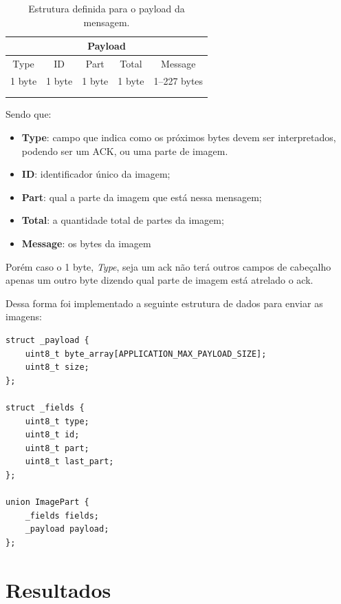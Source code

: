 \documentclass[
article,			%
12pt,				%
oneside,			%
a4paper,			%
english,			%
brazil,				%
sumario=tradicional
]{abntex2}
\begin{document}
\begin{table}[h]
\caption{Estrutura definida para o payload da mensagem.}
\centering
\begin{tabular}{cllll}
\hline
\multicolumn{5}{|c|}{Payload}    \\ \hline
\multicolumn{1}{|c|}{Type}   & \multicolumn{1}{c|}{ID}     & \multicolumn{1}{c|}{Part}   & \multicolumn{1}{c|}{Total}  & \multicolumn{1}{c|}{Message}      \\ \hline
\multicolumn{1}{|c|}{1 byte} & \multicolumn{1}{c|}{1 byte} & \multicolumn{1}{c|}{1 byte} & \multicolumn{1}{c|}{1 byte} & \multicolumn{1}{c|}{1--227 bytes} \\ \hline
\multicolumn{1}{l}{} &  &  &  &  \\
\multicolumn{1}{l}{} &  &  &  & 
\end{tabular}
\end{table}

Sendo que:
\begin{itemize}
    \item\textbf{Type}: campo que indica como os próximos bytes devem ser interpretados, podendo ser um ACK, ou uma parte de imagem.
    \item\textbf{ID}: identificador único da imagem;
    \item\textbf{Part}: qual a parte da imagem que está nessa mensagem;
    \item\textbf{Total}: a quantidade total de partes da imagem;
    \item\textbf{Message}: os bytes da imagem
\end{itemize}

Porém caso o 1 byte, \textit{Type}, seja um ack não terá outros campos de cabeçalho apenas um outro byte dizendo qual parte de imagem está atrelado o ack.

Dessa forma foi implementado a seguinte estrutura de dados para enviar as imagens:

\begin{lstlisting}[title=Definição da estrutura do payload]
struct _payload {
    uint8_t byte_array[APPLICATION_MAX_PAYLOAD_SIZE];
    uint8_t size;
};

struct _fields {
    uint8_t type;
    uint8_t id;
    uint8_t part;
    uint8_t last_part;
};

union ImagePart {
    _fields fields;
    _payload payload;
};
\end{lstlisting}


\cleardoublepage

\section{Resultados}\label{Resultados}
\end{document}
